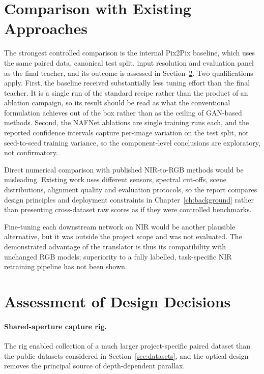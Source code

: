 \section{Comparison with Existing Approaches}
\label{sec:eval_priorwork}

The strongest controlled comparison is the internal Pix2Pix baseline, which uses the same paired data, canonical test split, input resolution and evaluation panel as the final teacher, and its outcome is assessed in Section~\ref{sec:eval_designbets}. Two qualifications apply. First, the baseline received substantially less tuning effort than the final teacher. It is a single run of the standard recipe rather than the product of an ablation campaign, so its result should be read as what the conventional formulation achieves out of the box rather than as the ceiling of GAN-based methods. Second, the NAFNet ablations are single training runs each, and the reported confidence intervals capture per-image variation on the test split, not seed-to-seed training variance, so the component-level conclusions are exploratory, not confirmatory.

Direct numerical comparison with published NIR-to-RGB methods would be misleading. Existing work uses different sensors, spectral cut-offs, scene distributions, alignment quality and evaluation protocols, so the report compares design principles and deployment constraints in Chapter~\ref{ch:background} rather than presenting cross-dataset raw scores as if they were controlled benchmarks.

Fine-tuning each downstream network on NIR would be another plausible alternative, but it was outside the project scope and was not evaluated. The demonstrated advantage of the translator is thus its compatibility with unchanged RGB models; superiority to a fully labelled, task-specific NIR retraining pipeline has not been shown.

\section{Assessment of Design Decisions}
\label{sec:eval_designbets}

\paragraph{Shared-aperture capture rig.}
The rig enabled collection of a much larger project-specific paired dataset than the public datasets considered in Section~\ref{sec:datasets}, and the optical design removes the principal source of depth-dependent parallax.

